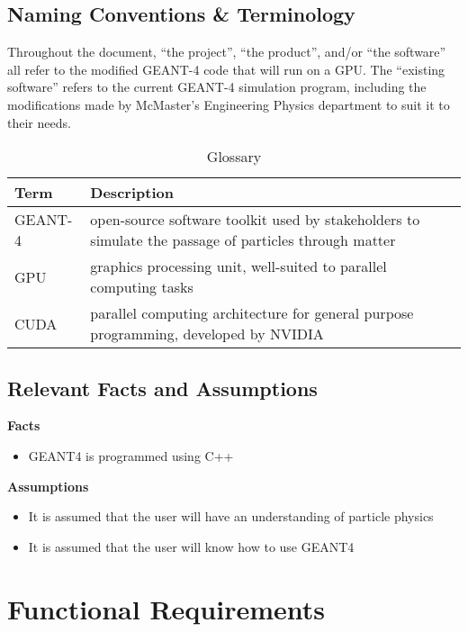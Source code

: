 \documentclass[12pt]{article}
\begin{document}
\subsection{Naming Conventions \& Terminology} %
Throughout the document, ``the project'', ``the product'', and/or ``the software'' all refer to the modified GEANT-4 code that will run on a GPU. The ``existing software'' refers to the current GEANT-4 simulation program, including the modifications made by McMaster's Engineering Physics department to suit it to their needs.\\

\begin{table}[h]
\centering
\begin{tabularx}{\textwidth}{|l|X|}
\hline
Term & Description\\
\hline
GEANT-4 & open-source software toolkit used by stakeholders to simulate the passage of particles through matter\\
GPU & graphics processing unit, well-suited to parallel computing tasks\\
CUDA & parallel computing architecture for general purpose programming, developed by NVIDIA\\
\hline
\end{tabularx}
\caption{Glossary}
\end{table}

\subsection{Relevant Facts and Assumptions} %
\textbf{Facts}
\begin{itemize}
	\item GEANT4 is programmed using C++
\end{itemize}
\textbf{Assumptions}
\begin{itemize}
	\item It is assumed that the user will have an understanding of particle physics
	\item It is assumed that the user will know how to use GEANT4
\end{itemize}

\section{Functional Requirements}
\end{document}
